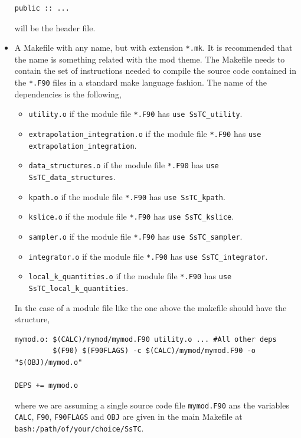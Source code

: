 \documentclass[10pt,a4paper]{article}
\begin{document}
\begin{tcolorbox}
\begin{itemize}
\begin{codebox}{}
\begin{lstlisting}[caption={Header file.},captionpos=b]
  public :: ...
\end{lstlisting}
\end{codebox}
will be the header file.
\item A Makefile with any name, but with extension \verb|*.mk|. It is recommended that the name is something related with the mod theme. The Makefile needs to contain the set of instructions needed to compile the source code contained in the \verb|*.F90| files in a standard make language fashion. The name of the dependencies is the following,
\begin{tcolorbox}
\begin{itemize}
\item \verb|utility.o| if the module file \verb|*.F90| has \verb|use SsTC_utility|.
\item \verb|extrapolation_integration.o| if the module file \verb|*.F90| has \verb|use extrapolation_integration|.
\item \verb|data_structures.o| if the module file \verb|*.F90| has \verb|use SsTC_data_structures|.
\item \verb|kpath.o| if the module file \verb|*.F90| has \verb|use SsTC_kpath|.
\item \verb|kslice.o| if the module file \verb|*.F90| has \verb|use SsTC_kslice|.
\item \verb|sampler.o| if the module file \verb|*.F90| has \verb|use SsTC_sampler|.
\item \verb|integrator.o| if the module file \verb|*.F90| has \verb|use SsTC_integrator|.
\item \verb|local_k_quantities.o| if the module file \verb|*.F90| has \verb|use SsTC_local_k_quantities|.
\end{itemize}
\end{tcolorbox}
In the case of a module file like the one above the makefile should have the structure,
\begin{codebox}{}
\begin{lstlisting}[caption={Makefile.},captionpos=b]
mymod.o: $(CALC)/mymod/mymod.F90 utility.o ... #All other deps
         $(F90) $(F90FLAGS) -c $(CALC)/mymod/mymod.F90 -o "$(OBJ)/mymod.o"

DEPS += mymod.o
\end{lstlisting}
\end{codebox}
where we are assuming a single source code file \verb|mymod.F90| ans the variables \verb|CALC|, \verb|F90|, \verb|F90FLAGS| and \verb|OBJ| are given in the main Makefile at \verb|bash:/path/of/your/choice/SsTC|.
\end{itemize}
\end{tcolorbox}
\end{document}
